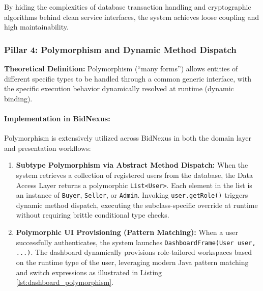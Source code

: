 By hiding the complexities of database transaction handling and cryptographic algorithms behind clean service interfaces, the system achieves loose coupling and high maintainability.

\subsubsection{Pillar 4: Polymorphism and Dynamic Method Dispatch}
\textbf{Theoretical Definition:} Polymorphism (``many forms'') allows entities of different specific types to be handled through a common generic interface, with the specific execution behavior dynamically resolved at runtime (dynamic binding).

\paragraph{Implementation in BidNexus:}
Polymorphism is extensively utilized across BidNexus in both the domain layer and presentation workflows:
\begin{enumerate}
    \item \textbf{Subtype Polymorphism via Abstract Method Dispatch:} When the system retrieves a collection of registered users from the database, the Data Access Layer returns a polymorphic \texttt{List<User>}. Each element in the list is an instance of \texttt{Buyer}, \texttt{Seller}, or \texttt{Admin}. Invoking \texttt{user.getRole()} triggers dynamic method dispatch, executing the subclass-specific override at runtime without requiring brittle conditional type checks.
    \item \textbf{Polymorphic UI Provisioning (Pattern Matching):} When a user successfully authenticates, the system launches \texttt{DashboardFrame(User user, ...)}. The dashboard dynamically provisions role-tailored workspaces based on the runtime type of the user, leveraging modern Java pattern matching and switch expressions as illustrated in Listing \ref{lst:dashboard_polymorphism}.
\end{enumerate}

